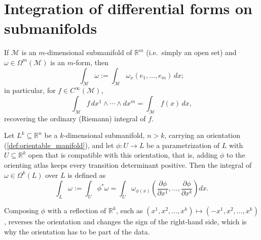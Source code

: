 
\section{Integration of differential forms on submanifolds}
\label{sec:integration_of_forms}

If $\mathcal{M}$ is an $m$-dimensional submanifold of $\mathbb{R}^m$ (i.e.\ simply an open set)
and $\omega \in \Omega^m(\mathcal{M})$ is an $m$-form, then
\[\int_{\mathcal{M}} \omega := \int_{\mathcal{M}} \omega_x(e_1,\ldots,e_m)\,dx;\]
in particular, for $f \in C^\infty(\mathcal{M})$,
\[\int_{\mathcal{M}} f\,dx^1\wedge\cdots\wedge dx^m = \int_{\mathcal{M}} f(x)\,dx,\]
recovering the ordinary (Riemann) integral of $f$.

\begin{definition}
\label{def:integral_of_form_over_submanifold}
Let $L^k \subseteq \mathbb{R}^n$ be a $k$-dimensional submanifold, $n>k$, carrying an orientation
(\cref{def:orientable_manifold}), and let $\phi : U \to L$ be a parametrization of $L$ with
$U \subseteq \mathbb{R}^k$ open that is compatible with this orientation, that is, adding $\phi$
to the orienting atlas keeps every transition determinant positive. Then the integral of
$\omega \in \Omega^k(L)$ over $L$ is defined as
\[\int_L \omega := \int_U \phi^*\omega = \int_U \omega_{\phi(x)}\!\left(\frac{\partial\phi}
  {\partial x^1},\ldots,\frac{\partial\phi}{\partial x^k}\right) dx.\]
\end{definition}

Composing $\phi$ with a reflection of $\mathbb{R}^k$, such as
$(x^1,x^2,\dots,x^k) \mapsto (-x^1,x^2,\dots,x^k)$, reverses the orientation and changes the sign
of the right-hand side, which is why the orientation has to be part of the data.

